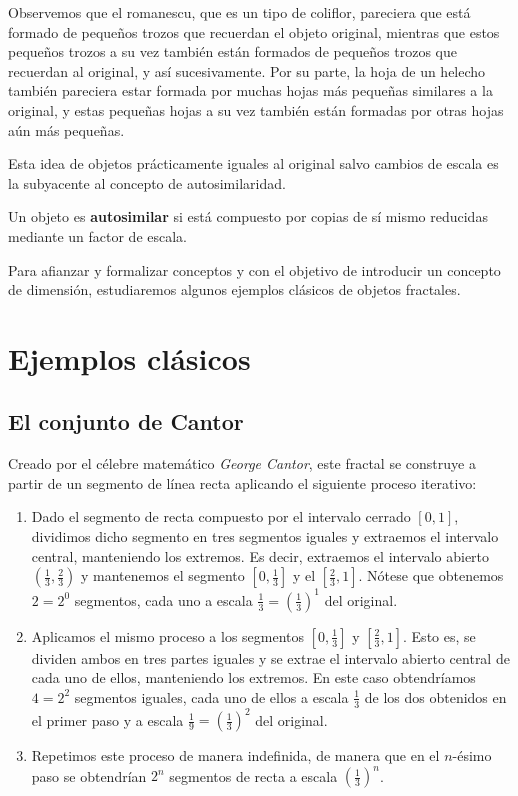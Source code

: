 Observemos que el romanescu, que es un tipo de coliflor, pareciera que está formado de pequeños trozos que recuerdan el objeto original, mientras que estos pequeños trozos a su vez también están formados de pequeños trozos que recuerdan al original, y así sucesivamente. Por su parte, la hoja de un helecho también pareciera estar formada por muchas hojas más pequeñas similares a la original, y estas pequeñas hojas a su vez también están formadas por otras hojas aún más pequeñas.

Esta idea de objetos prácticamente iguales al original salvo cambios de escala es la subyacente al concepto de autosimilaridad.

\begin{definicion}[Autosimilaridad] Un objeto es \textbf{autosimilar} si está compuesto por copias de sí mismo reducidas mediante un factor de escala.
\end{definicion}

Para afianzar y formalizar conceptos y con el objetivo de introducir un concepto de dimensión, estudiaremos algunos ejemplos clásicos de objetos fractales.

\section{Ejemplos clásicos}
\label{section:ejemplos}

\subsection{El conjunto de Cantor}
\label{subsection:Cantor}

Creado por el célebre matemático \textit{George Cantor}, este fractal se construye a partir de un segmento de línea recta aplicando el siguiente proceso iterativo:

\begin{enumerate}
\item Dado el segmento de recta compuesto por el intervalo cerrado $[0,1]$, dividimos dicho segmento en tres segmentos iguales y extraemos el intervalo central, manteniendo los extremos. Es decir, extraemos el intervalo abierto $\left(\frac 1 3, \frac 2 3\right)$ y mantenemos el segmento $\left[0,\frac 1 3\right]$ y el $\left[\frac 2 3, 1\right]$. Nótese que obtenemos $2=2^0$ segmentos, cada uno a escala $\frac 1 3=\left(\frac 1 3\right)^1$ del original.

\item Aplicamos el mismo proceso a los segmentos $\left[0,\frac 1 3\right]$ y $\left[\frac 2 3, 1\right]$. Esto es, se dividen ambos en tres partes iguales y se extrae el intervalo abierto central de cada uno de ellos, manteniendo los extremos. En este caso obtendríamos $4=2^2$ segmentos iguales, cada uno de ellos a escala $\frac 1 3$ de los dos obtenidos en el primer paso y a escala $\frac 1 9=\left(\frac 1 3\right)^2$ del original.

\item Repetimos este proceso de manera indefinida, de manera que en el $n$-ésimo paso se obtendrían $2^n$ segmentos de recta a escala $\left(\frac 1 3\right)^n$.
\end{enumerate} 

